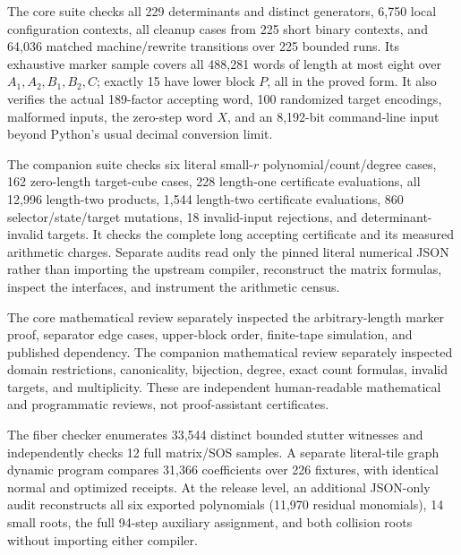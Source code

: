 \documentclass[11pt,letterpaper]{article}
\theoremstyle{definition}
\theoremstyle{remark}
\begin{document}
The core suite checks all 229 determinants and distinct generators, 6,750 local configuration contexts, all cleanup cases from 225 short binary contexts, and 64,036 matched machine/rewrite transitions over 225 bounded runs. Its exhaustive marker sample covers all 488,281 words of length at most eight over $A_1,A_2,B_1,B_2,C$; exactly 15 have lower block $P$, all in the proved form. It also verifies the actual 189-factor accepting word, 100 randomized target encodings, malformed inputs, the zero-step word $X$, and an 8,192-bit command-line input beyond Python's usual decimal conversion limit.

The companion suite checks six literal small-$r$ polynomial/count/degree cases, 162 zero-length target-cube cases, 228 length-one certificate evaluations, all 12,996 length-two products, 1,544 length-two certificate evaluations, 860 selector/state/target mutations, 18 invalid-input rejections, and determinant-invalid targets. It checks the complete long accepting certificate and its measured arithmetic charges. Separate audits read only the pinned literal numerical JSON rather than importing the upstream compiler, reconstruct the matrix formulas, inspect the interfaces, and instrument the arithmetic census.

The core mathematical review separately inspected the arbitrary-length marker proof, separator edge cases, upper-block order, finite-tape simulation, and published dependency. The companion mathematical review separately inspected domain restrictions, canonicality, bijection, degree, exact count formulas, invalid targets, and multiplicity. These are independent human-readable mathematical and programmatic reviews, not proof-assistant certificates.

The fiber checker enumerates 33,544 distinct bounded stutter witnesses and independently checks 12 full matrix/SOS samples. A separate literal-tile graph dynamic program compares 31,366 coefficients over 226 fixtures, with identical normal and optimized receipts. At the release level, an additional JSON-only audit reconstructs all six exported polynomials (11,970 residual monomials), 14 small roots, the full 94-step auxiliary assignment, and both collision roots without importing either compiler.
\end{document}

